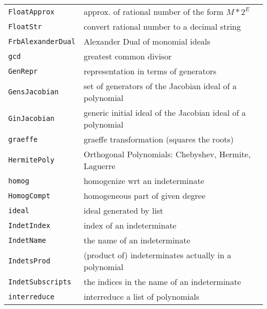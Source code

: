\documentclass[a4paper]{mybook}
\begin{document}
\begin{center}
\begin{longtable}{ll}
{\verb~FloatApprox~} &
      approx. of rational number of the form $M*2^E$\\
   
{\verb~FloatStr~} &
      convert rational number to a decimal string\\
   
{\verb~FrbAlexanderDual~} &
      Alexander Dual of monomial ideals\\
   
{\verb~gcd~} &
      greatest common divisor\\
   
{\verb~GenRepr~} &
      representation in terms of generators\\
   
{\verb~GensJacobian~} &
      set of generators of the Jacobian ideal of a polynomial\\
   
{\verb~GinJacobian~} &
      generic initial ideal of the Jacobian ideal of a polynomial\\
   
{\verb~graeffe~} &
      graeffe transformation (squares the roots)\\
   
{\verb~HermitePoly~} &
      Orthogonal Polynomials: Chebyshev, Hermite, Laguerre\\
   
{\verb~homog~} &
      homogenize wrt an indeterminate\\
   
{\verb~HomogCompt~} &
      homogeneous part of given degree\\
   
{\verb~ideal~} &
      ideal generated by list\\
   
{\verb~IndetIndex~} &
      index of an indeterminate\\
   
{\verb~IndetName~} &
      the name of an indeterminate\\
   
{\verb~IndetsProd~} &
      (product of) indeterminates actually in a polynomial\\
   
{\verb~IndetSubscripts~} &
      the indices in the name of an indeterminate\\
   
{\verb~interreduce~} &
      interreduce a list of polynomials\\
   

\end{longtable}
\end{center}
\end{document}
